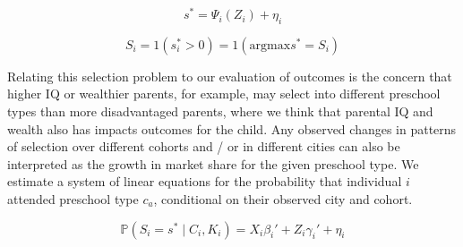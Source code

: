 \documentclass[10pt]{article}
\begin{document}
\begin{equation}
s^{*} = \Psi_i(Z_i) + \eta_i
\end{equation}

\begin{equation}
S_{i} = 1(s^{*}_{i} > 0) = 1(\mathrm{argmax} s^{*} = S_i) 
\end{equation}


Relating this selection problem to our evaluation of outcomes is the concern that higher IQ or wealthier parents, for example, may select into different preschool types than more disadvantaged parents, where we think that parental IQ and wealth also has impacts outcomes for the child. Any observed changes in patterns of selection over different cohorts and / or in different cities can also be interpreted as the growth in market share for the given preschool type. We estimate a system of linear equations for the probability that individual $i$ attended preschool type $c_a$, conditional on their observed city and cohort.

\begin{equation}
\mathbb{P}(S_i = s^*\mid C_i, K_i) = X_i\beta_i' + Z_i \gamma_i' + \eta_i
\end{equation}
\end{document}
